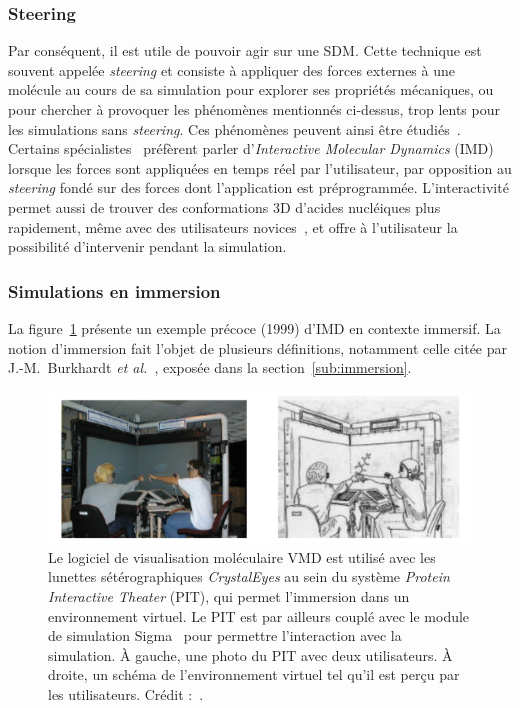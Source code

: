 	\subsubsection{Steering}
	Par conséquent, il est utile de pouvoir agir sur une SDM. Cette technique est souvent appelée \emph{steering} et consiste à appliquer des forces externes à une molécule au cours de sa simulation pour explorer ses propriétés mécaniques, ou pour chercher à provoquer les phénomènes mentionnés ci-dessus, trop lents pour les simulations sans \emph{steering}. Ces phénomènes peuvent ainsi être étudiés~\cite{izrailev1999steered, isralewitz2001steered, isralewitz2001steered}. Certains spécialistes~\cite{phillips2005scalable} préfèrent parler d'\emph{Interactive Molecular Dynamics} (IMD)~\cite{stone2001system, grayson2003mechanisms} lorsque les forces sont appliquées en temps réel par l'utilisateur, par opposition au \emph{steering} fondé sur des forces dont l'application est préprogrammée. L'interactivité permet aussi de trouver des conformations 3D d'acides nucléiques plus rapidement, même avec des utilisateurs novices~\cite{mazzanti2017can}, et offre à l'utilisateur la possibilité d'intervenir pendant la simulation.
	
	\subsubsection{Simulations en immersion}
	La figure~\ref{fig:steeredPIT} présente un exemple précoce (1999) d'IMD en contexte immersif. La notion d'immersion fait l'objet de plusieurs définitions, notamment celle citée par J.-M.~Burkhardt \emph{et al.}~\cite{burkhardt2003immersion}, exposée dans la section~\ref{sub:immersion}.
	
	\begin{figure}[htbp]
		\centering
		\includegraphics[width=\textwidth]{figures/ch1/steeredPIT}
		\caption[Dynamique moléculaire interactive en environnement virtuel]{Le logiciel de visualisation moléculaire VMD est utilisé avec les lunettes sétérographiques \emph{CrystalEyes} au sein du système \emph{Protein Interactive Theater} (PIT), qui permet l'immersion dans un environnement virtuel. Le PIT est par ailleurs couplé avec le module de simulation Sigma~\cite{mann2002sigma} pour permettre l'interaction avec la simulation. À gauche, une photo du PIT avec deux utilisateurs. À droite, un schéma de l'environnement virtuel tel qu'il est perçu par les utilisateurs. Crédit :~\cite{prins1999virtual}.}
		\label{fig:steeredPIT}
	\end{figure}
	
